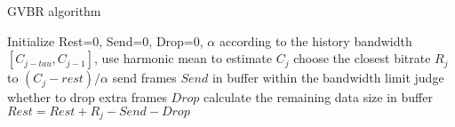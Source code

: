 \begin{algorithm}[h]
\caption{GVBR algorithm}
\label{alg:greedy-vbr}
\begin{algorithmic}[1]
\State Initialize Rest=0, Send=0, Drop=0, $\alpha$
\State according to the history bandwidth $[C_{j-tau},C_{j-1}]$, use harmonic mean to estimate $C_j$
\State choose the closest bitrate $R_j$ to $(C_j-rest)/\alpha$
\State send frames $Send$ in buffer within the bandwidth limit
\State judge whether to drop extra frames $Drop$
\State calculate the remaining data size in buffer $Rest = Rest + R_j - Send - Drop$
\EndFor
\end{algorithmic}
\end{algorithm} 